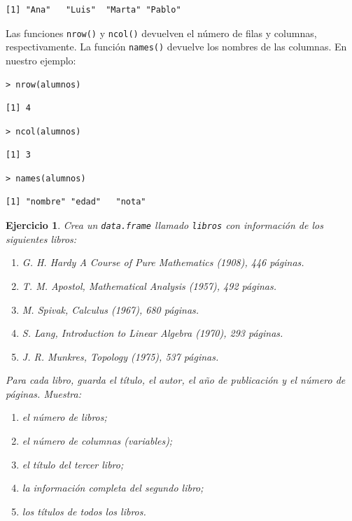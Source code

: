 \documentclass[11pt,a4paper]{article}
\theoremstyle{exercise}
\newtheorem{exercise}{Ejercicio}
\begin{document}
\begin{lstlisting}[style=routput]
[1] "Ana"   "Luis"  "Marta" "Pablo"
\end{lstlisting}


Las funciones \texttt{nrow()} y \texttt{ncol()} devuelven el número de filas y columnas, respectivamente. La función \texttt{names()} devuelve los nombres de las columnas. En nuestro ejemplo:

\begin{lstlisting}[style=rconsole]
> nrow(alumnos)
\end{lstlisting}

\begin{lstlisting}[style=routput]
[1] 4
\end{lstlisting}

\begin{lstlisting}[style=rconsole]
> ncol(alumnos)
\end{lstlisting}

\begin{lstlisting}[style=routput]
[1] 3
\end{lstlisting}

\begin{lstlisting}[style=rconsole]
> names(alumnos)
\end{lstlisting}

\begin{lstlisting}[style=routput]
[1] "nombre" "edad"   "nota" 
\end{lstlisting}



\begin{exercise}\label{ej:libros}
Crea un \texttt{data.frame} llamado \texttt{libros} con información de los siguientes libros:
\begin{enumerate}
	\item G. H. Hardy \emph{A Course of Pure Mathematics} (1908), 446 páginas.
	\item T. M. Apostol, \emph{Mathematical Analysis} (1957), 492 páginas.
	\item M. Spivak, \emph{Calculus} (1967), 680 páginas.
	\item S. Lang, \emph{Introduction to Linear Algebra} (1970), 293 páginas.
	\item J. R. Munkres, \emph{Topology} (1975), 537 páginas. 
\end{enumerate}
Para cada libro, guarda el título, el autor, el año de publicación y el número de páginas. Muestra:
\begin{enumerate}
    \item[a)] el número de libros;
    \item[b)] el número de columnas (variables);
    \item[c)] el título del tercer libro;
    \item[d)] la información completa del segundo libro;
    \item[e)] los títulos de todos los libros.
\end{enumerate}
\end{exercise}
\end{document}
